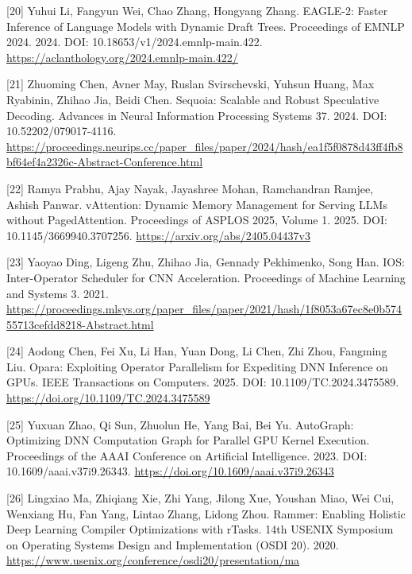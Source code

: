 \documentclass[UTF8,11pt,fontset=windows]{ctexart}
\begin{document}
\leavevmode{}%
{[}20{]} Yuhui Li, Fangyun Wei, Chao Zhang, Hongyang Zhang. EAGLE-2: Faster Inference of Language Models with Dynamic Draft Trees. Proceedings of EMNLP 2024. 2024. DOI: 10.18653/v1/2024.emnlp-main.422. \url{https://aclanthology.org/2024.emnlp-main.422/}

\leavevmode{}%
{[}21{]} Zhuoming Chen, Avner May, Ruslan Svirschevski, Yuhsun Huang, Max Ryabinin, Zhihao Jia, Beidi Chen. Sequoia: Scalable and Robust Speculative Decoding. Advances in Neural Information Processing Systems 37. 2024. DOI: 10.52202/079017-4116. \url{https://proceedings.neurips.cc/paper_files/paper/2024/hash/ea1f5f0878d43ff4fb8bf64ef4a2326c-Abstract-Conference.html}

\leavevmode{}%
{[}22{]} Ramya Prabhu, Ajay Nayak, Jayashree Mohan, Ramchandran Ramjee, Ashish Panwar. vAttention: Dynamic Memory Management for Serving LLMs without PagedAttention. Proceedings of ASPLOS 2025, Volume 1. 2025. DOI: 10.1145/3669940.3707256. \url{https://arxiv.org/abs/2405.04437v3}

\leavevmode{}%
{[}23{]} Yaoyao Ding, Ligeng Zhu, Zhihao Jia, Gennady Pekhimenko, Song Han. IOS: Inter-Operator Scheduler for CNN Acceleration. Proceedings of Machine Learning and Systems 3. 2021. \url{https://proceedings.mlsys.org/paper_files/paper/2021/hash/1f8053a67ec8e0b57455713cefdd8218-Abstract.html}

\leavevmode{}%
{[}24{]} Aodong Chen, Fei Xu, Li Han, Yuan Dong, Li Chen, Zhi Zhou, Fangming Liu. Opara: Exploiting Operator Parallelism for Expediting DNN Inference on GPUs. IEEE Transactions on Computers. 2025. DOI: 10.1109/TC.2024.3475589. \url{https://doi.org/10.1109/TC.2024.3475589}

\leavevmode{}%
{[}25{]} Yuxuan Zhao, Qi Sun, Zhuolun He, Yang Bai, Bei Yu. AutoGraph: Optimizing DNN Computation Graph for Parallel GPU Kernel Execution. Proceedings of the AAAI Conference on Artificial Intelligence. 2023. DOI: 10.1609/aaai.v37i9.26343. \url{https://doi.org/10.1609/aaai.v37i9.26343}

\leavevmode{}%
{[}26{]} Lingxiao Ma, Zhiqiang Xie, Zhi Yang, Jilong Xue, Youshan Miao, Wei Cui, Wenxiang Hu, Fan Yang, Lintao Zhang, Lidong Zhou. Rammer: Enabling Holistic Deep Learning Compiler Optimizations with rTasks. 14th USENIX Symposium on Operating Systems Design and Implementation (OSDI 20). 2020. \url{https://www.usenix.org/conference/osdi20/presentation/ma}
\end{document}
